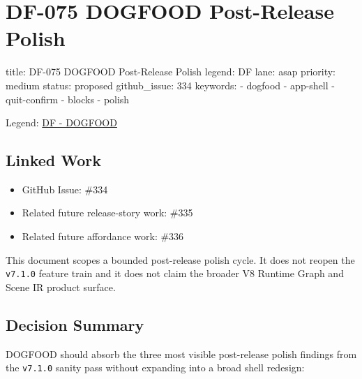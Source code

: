 \chapter{DF-075 DOGFOOD Post-Release Polish}\label{record-115}

\smallskip

\begin{RecordMeta}
title: DF-075 DOGFOOD Post-Release Polish
legend: DF
lane: asap
priority: medium
status: proposed
github_issue: 334
keywords:
  - dogfood
  - app-shell
  - quit-confirm
  - blocks
  - polish

\end{RecordMeta}

Legend: \href{https://github.com/flyingrobots/bijou/blob/1853ad902f6bf219326409e7f743a5a1d6517dbc/docs/legends/DF-dogfood-field-guide.md}{DF - DOGFOOD}

\section{Linked Work}\label{record-115-linked-work}

\begin{itemize}
\tightlist
\item
  GitHub Issue: \#334
\item
  Related future release-story work: \#335
\item
  Related future affordance work: \#336
\end{itemize}

This document scopes a bounded post-release polish cycle. It does not reopen the \texttt{v\allowbreak{}7\allowbreak{}.\allowbreak{}1\allowbreak{}.\allowbreak{}0} feature train and it does not claim the broader V8 Runtime Graph and Scene IR product surface.

\section{Decision Summary}\label{record-115-decision-summary}

DOGFOOD should absorb the three most visible post-release polish findings from the \texttt{v\allowbreak{}7\allowbreak{}.\allowbreak{}1\allowbreak{}.\allowbreak{}0} sanity pass without expanding into a broad shell redesign:


